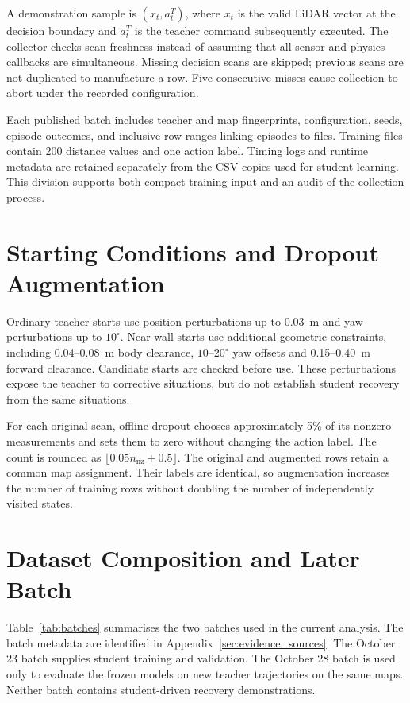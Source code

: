 A demonstration sample is $(x_t,a_t^T)$, where $x_t$ is the valid LiDAR vector
at the decision boundary and $a_t^T$ is the teacher command subsequently
executed. The collector checks scan freshness instead of assuming that all
sensor and physics callbacks are simultaneous. Missing decision scans are
skipped; previous scans are not duplicated to manufacture a row. Five
consecutive misses cause collection to abort under the recorded configuration.

Each published batch includes teacher and map fingerprints, configuration,
seeds, episode outcomes, and inclusive row ranges linking episodes to files.
Training files contain 200 distance values and one action label. Timing logs
and runtime metadata are retained separately from the CSV copies used for
student learning. This division supports both compact training input and
an audit of the collection process.

\section{Starting Conditions and Dropout Augmentation}
Ordinary teacher starts use position perturbations up to 0.03~m and yaw
perturbations up to $10^\circ$. Near-wall starts use additional geometric
constraints, including 0.04--0.08~m body clearance, $10$--$20^\circ$ yaw offsets
and 0.15--0.40~m forward clearance. Candidate starts are checked before use.
These perturbations expose the teacher to corrective situations, but do not
establish student recovery from the same situations.

For each original scan, offline dropout chooses approximately 5\% of its
nonzero measurements and sets them to zero without changing the action label.
The count is rounded as $\lfloor0.05n_{\mathrm{nz}}+0.5\rfloor$. The original
and augmented rows retain a common map assignment. Their labels are identical,
so augmentation increases the number of training rows without doubling the
number of independently visited states.

\section{Dataset Composition and Later Batch}
Table~\ref{tab:batches} summarises the two batches used in the current analysis.
The batch metadata are identified in Appendix~\ref{sec:evidence_sources}.
The October 23 batch supplies student training and validation. The October 28
batch is used only to evaluate the frozen models on new teacher trajectories
on the same maps. Neither batch contains student-driven recovery demonstrations.


